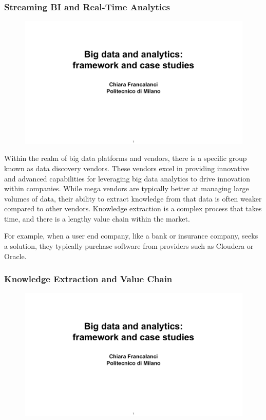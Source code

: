 \subsubsection{Streaming BI and Real-Time Analytics}

\begin{figure}[!h]
  \centering
  \includegraphics[page=58, trim = 0cm 2cm 0cm 4.5cm, clip, width=\imagewidth]{images/06 - BIG_DATA.pdf}
\end{figure}

Within the realm of big data platforms and vendors, there is a specific
group known as data discovery vendors. These vendors excel in providing
innovative and advanced capabilities for leveraging big data analytics
to drive innovation within companies. While mega vendors are typically
better at managing large volumes of data, their ability to extract
knowledge from that data is often weaker compared to other vendors.
Knowledge extraction is a complex process that takes time, and there is
a lengthy value chain within the market.

For example, when a user end company, like a bank or insurance company,
seeks a solution, they typically purchase software from providers such
as Cloudera or Oracle.

\subsubsection{Knowledge Extraction and Value Chain}

\begin{figure}[!h]
  \centering
  \includegraphics[page=59, trim = 1cm 0.5cm 2.5cm 3.5cm, clip, width=\imagewidth]{images/06 - BIG_DATA.pdf}
\end{figure}

